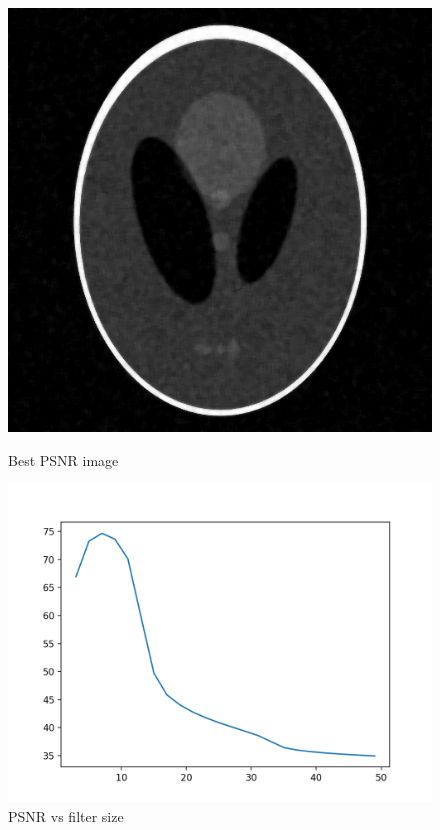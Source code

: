 \documentclass{article}
\begin{document}
    \begin{figure}[!htb]
      \includegraphics[scale=0.3]{./basic_denoising/shepplogan/median_best_gaussian.png}
      \caption{Best PSNR image}
    \endminipage \hfill
      \includegraphics[scale=.45]{./basic_denoising/shepplogan/median_psnr_gaussian.png}
      \caption{PSNR vs filter size}
    \endminipage
    \end{figure}
    \pagebreak
\end{document}
